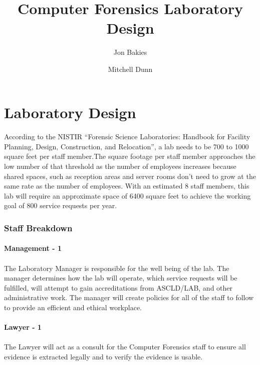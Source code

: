 \documentclass{article}
\begin{document}
\title{Computer Forensics Laboratory Design}
\author{Jon Bakies \and Mitchell Dunn} 

\maketitle
\newpage

\tableofcontents
\newpage


\section{Laboratory Design}

\paragraph{} According to the NISTIR ``Forensic Science Laboratories: Handbook for Facility Planning, Design, Construction, and Relocation'', a lab needs to be 700 to 1000 square feet per staff member.The square footage per staff member approaches the low number of that threshold as the number of employees increases because shared spaces, such as reception areas and server rooms don't need to grow at the same rate as the number of employees.  With an estimated 8 staff members, this lab will require an approximate space of 6400 square feet to achieve the working goal of 800 service requests per year.

\subsubsection{Staff Breakdown}
\paragraph {Management - 1} 
\paragraph{} The Laboratory Manager is responsible for the well being of the lab.  The manager determines how the lab will operate, which service requests will be fulfilled, will attempt to gain accreditations from ASCLD/LAB, and other administrative work.  The manager will create policies for all of the staff to follow to provide an efficient and ethical workplace.
 
\paragraph{Lawyer - 1} 
\paragraph{} The Lawyer will act as a consult for the Computer Forensics staff to ensure all evidence is extracted legally and to verify the evidence is usable.
\end{document}
